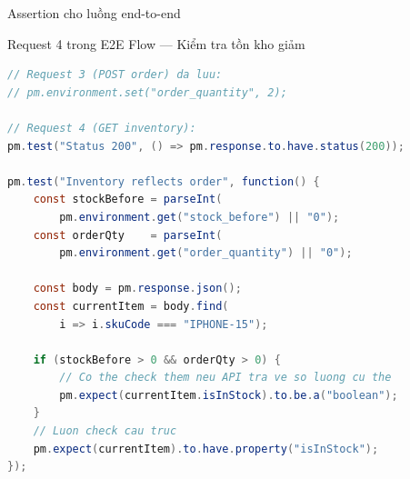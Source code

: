\documentclass[aspectratio=169,10pt]{beamer}
\begin{document}
\begin{frame}[fragile]{Assertion cho luồng end-to-end}
  \begin{block}{Request 4 trong E2E Flow --- Kiểm tra tồn kho giảm}
\begin{lstlisting}[language=Java,style=nonumber]
// Request 3 (POST order) da luu:
// pm.environment.set("order_quantity", 2);

// Request 4 (GET inventory):
pm.test("Status 200", () => pm.response.to.have.status(200));

pm.test("Inventory reflects order", function() {
    const stockBefore = parseInt(
        pm.environment.get("stock_before") || "0");
    const orderQty    = parseInt(
        pm.environment.get("order_quantity") || "0");

    const body = pm.response.json();
    const currentItem = body.find(
        i => i.skuCode === "IPHONE-15");

    if (stockBefore > 0 && orderQty > 0) {
        // Co the check them neu API tra ve so luong cu the
        pm.expect(currentItem.isInStock).to.be.a("boolean");
    }
    // Luon check cau truc
    pm.expect(currentItem).to.have.property("isInStock");
});
\end{lstlisting}
  \end{block}
\end{frame}
\end{document}
